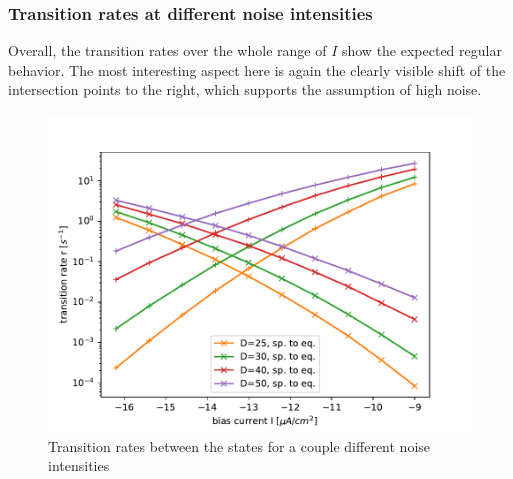 \documentclass[12pt,a4paper]{article}
\begin{document}
\subsubsection{Transition rates at different noise intensities}
Overall, the transition rates over the whole range of $I$ show the expected regular behavior. The most interesting aspect here is again the clearly visible shift of the intersection points to the right, which supports the assumption of high noise.
\begin{figure}[H]
	\centering
	\includegraphics[scale=1]{tranratesrinzel.pdf}\caption{Transition rates between the states for a couple different noise intensities}
	\label{tranratesrinzel}
\end{figure}
\end{document}
